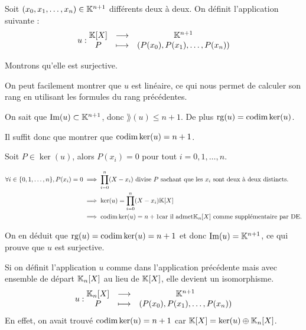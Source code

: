 \documentclass[11pt,a4paper]{report}
\begin{document}
\begin{application}
    Soit $(x_0, x_1, \dots, x_n) \in \mathbb{K}^{n+1}$ différents deux à deux. On définit l'application suivante :
    $$u : \begin{matrix} \mathbb{K}[X] & \longrightarrow & \mathbb{K}^{n+1} \\ P & \longmapsto & (P(x_0), P(x_1), \dots, P(x_n)) \end{matrix}$$

    Montrons qu'elle est surjective.

    On peut facilement montrer que $u$ est linéaire, ce qui nous permet de calculer son rang en utilisant les formules du rang précédentes.

    On sait que $\mathrm{Im}(u) \subset \mathbb{K}^{n+1}$, donc $\rang(u) \leq n+1$. De plus $\mathrm{rg}(u) = \mathrm{codim}\ker(u)$.
    
    Il suffit donc que montrer que $\mathrm{codim}\ker(u) = n+1$.

    Soit $P \in \ker(u)$, alors $P(x_i) = 0$ pour tout $i = 0, 1, \dots, n$.

    \begin{align*}
        \forall i \in \{0, 1, \dots, n\}, P(x_i) = 0 &\implies \prod_{i=0}^n (X - x_i) \text{ divise } P \text{ sachant que les } x_i \text{ sont deux à deux distincts.}\\
        &\implies \ker(u) = \prod_{i=0}^n (X - x_i) \mathbb{K}[X] \\
        &\implies \mathrm{codim}\ker(u) = n+1 \text{car il admet} \mathbb{K}_n[X] \text{ comme supplémentaire par DE.}
    \end{align*}

    On en déduit que $\mathrm{rg}(u) = \mathrm{codim}\ker(u) = n+1$ et donc $\mathrm{Im}(u) = \mathbb{K}^{n+1}$, ce qui prouve que $u$ est surjective.
\end{application}

\begin{application}
    Si on définit l'application $u$ comme dans l'application précédente mais avec ensemble de départ $\mathbb{K}_n[X]$ au lieu de $\mathbb{K}[X]$, elle devient un isomorphisme.
    $$u : \begin{matrix} \mathbb{K}_n[X] & \longrightarrow & \mathbb{K}^{n+1} \\ P & \longmapsto & (P(x_0), P(x_1), \dots, P(x_n)) \end{matrix}$$
    En effet, on avait trouvé $\mathrm{codim}\ker(u) = n+1$ car $\mathbb{K}[X] = \ker(u) \oplus \mathbb{K}_n[X]$.
\end{application}
\end{document}
